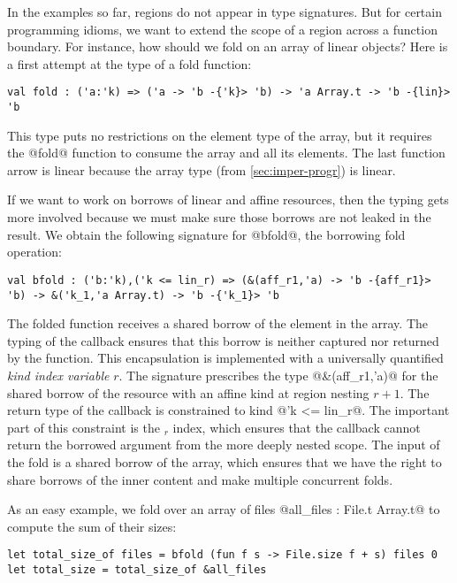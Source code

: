 In the examples so far, regions do not appear in type signatures.
But for certain programming idioms, we want to extend the scope of a
region across a function boundary.
For instance, how should we fold on an array of linear objects?
Here is a first attempt at the type of a fold function:
\begin{lstlisting}[numbers=none]
val fold : ('a:'k) => ('a -> 'b -{'k}> 'b) -> 'a Array.t -> 'b -{lin}> 'b
\end{lstlisting}
This type puts no restrictions on the element type of the array, but
it requires the @fold@ function to consume the array and all its
elements. The last function arrow is linear because the array type (from
\cref{sec:imper-progr}) is linear. 

If we want to work on borrows of linear and affine resources, then the
typing gets more involved because
we must make sure those borrows are not leaked in the result.
We obtain the following signature for @bfold@, the borrowing fold operation:
\begin{lstlisting}[numbers=none]
val bfold : ('b:'k),('k <= lin_r) => (&(aff_r1,'a) -> 'b -{aff_r1}> 'b) -> &('k_1,'a Array.t) -> 'b -{'k_1}> 'b
\end{lstlisting}

The folded function receives a shared borrow of the element in the array.
The typing of the callback ensures
that this borrow is neither captured nor returned by the function.
%
This encapsulation is implemented with a universally quantified \emph{kind index variable} $r$.
The signature prescribes the type @&(aff_r1,'a)@ for the
shared borrow of the resource with an affine kind at region nesting $r+1$. The return
type of the callback is constrained to kind @'k <= lin_r@. The
important part of this constraint is the $_r$ index, which ensures
that the callback cannot return the borrowed argument from the more
deeply nested scope. 
%
The input of the fold is a shared borrow of the array,
which ensures that we have the right to share borrows of the inner content and
make multiple concurrent folds.

As an easy example, we fold over an array of files
@all_files : File.t Array.t@ to compute the sum of their sizes:
\begin{lstlisting}[numbers=none]
let total_size_of files = bfold (fun f s -> File.size f + s) files 0
let total_size = total_size_of &all_files
\end{lstlisting}

